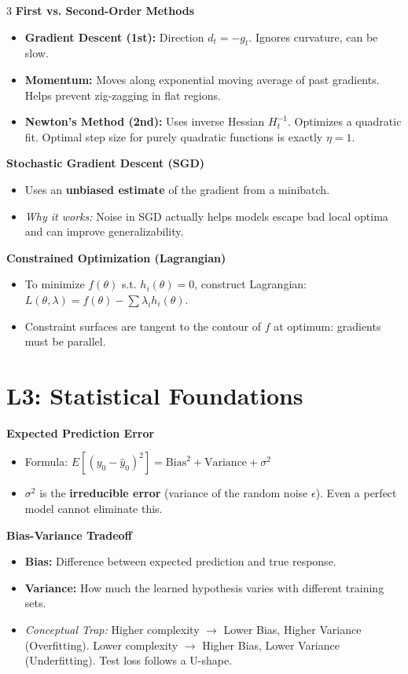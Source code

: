 \documentclass[10pt,landscape]{article}
\begin{document}
\begin{multicols*}{3}
\textbf{First vs. Second-Order Methods}
\begin{itemize}
    \item \textbf{Gradient Descent (1st):} Direction $d_t = -g_t$. Ignores curvature, can be slow.
    \item \textbf{Momentum:} Moves along exponential moving average of past gradients. Helps prevent zig-zagging in flat regions.
    \item \textbf{Newton's Method (2nd):} Uses inverse Hessian $H_t^{-1}$. Optimizes a quadratic fit. Optimal step size for purely quadratic functions is exactly $\eta=1$.
\end{itemize}

\textbf{Stochastic Gradient Descent (SGD)}
\begin{itemize}
    \item Uses an \textbf{unbiased estimate} of the gradient from a minibatch.
    \item \textit{Why it works:} Noise in SGD actually helps models escape bad local optima and can improve generalizability.
\end{itemize}

\textbf{Constrained Optimization (Lagrangian)}
\begin{itemize}
    \item To minimize $f(\theta)$ s.t. $h_i(\theta) = 0$, construct Lagrangian: $L(\theta, \lambda) = f(\theta) - \sum \lambda_i h_i(\theta)$.
    \item Constraint surfaces are tangent to the contour of $f$ at optimum: gradients must be parallel.
\end{itemize}

\section{L3: Statistical Foundations}
\textbf{Expected Prediction Error}
\begin{itemize}
    \item Formula: $E[(y_0 - \hat{y}_0)^2] = \text{Bias}^2 + \text{Variance} + \sigma^2$
    \item $\sigma^2$ is the \textbf{irreducible error} (variance of the random noise $\epsilon$). Even a perfect model cannot eliminate this.
\end{itemize}

\textbf{Bias-Variance Tradeoff}
\begin{itemize}
    \item \textbf{Bias:} Difference between expected prediction and true response.
    \item \textbf{Variance:} How much the learned hypothesis varies with different training sets.
    \item \textit{Conceptual Trap:} Higher complexity $\to$ Lower Bias, Higher Variance (Overfitting). Lower complexity $\to$ Higher Bias, Lower Variance (Underfitting). Test loss follows a U-shape.
\end{itemize}


\end{multicols*}
\end{document}
